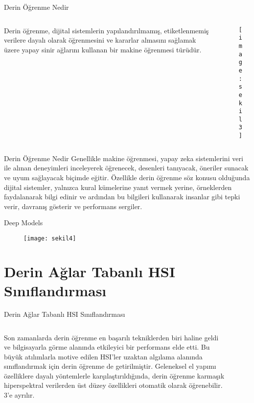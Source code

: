 \documentclass{beamer}
\begin{document}
\begin{frame}{Derin Öğrenme Nedir}
  \begin{columns}
    \begin{column}{0.5\textwidth}
Derin öğrenme, dijital sistemlerin yapılandırılmamış, etiketlenmemiş verilere dayalı olarak öğrenmesini ve kararlar almasını sağlamak üzere yapay sinir ağlarını kullanan bir makine öğrenmesi türüdür.
    \end{column}
    \begin{column}{0.5\textwidth}
      \begin{figure}
    \texttt{[image: sekil3]}
      \end{figure}
    \end{column}
  \end{columns}
\end{frame}

\begin{frame}{Derin Öğrenme Nedir}
  Genellikle makine öğrenmesi, yapay zeka sistemlerini veri ile alınan deneyimleri inceleyerek öğrenecek, desenleri tanıyacak, öneriler sunacak ve uyum sağlayacak biçimde eğitir. Özellikle derin öğrenme söz konusu olduğunda dijital sistemler, yalnızca kural kümelerine yanıt vermek yerine, örneklerden faydalanarak bilgi edinir ve ardından bu bilgileri kullanarak insanlar gibi tepki verir, davranış gösterir ve performans sergiler.
\end{frame}

\begin{frame}{Deep Models }
  \begin{figure}
    \centering
    \texttt{[image: sekil4]}
  \end{figure}
\end{frame}

\section{Derin Ağlar Tabanlı HSI Sınıflandırması}
\begin{frame}{Derin Ağlar Tabanlı HSI Sınıflandırması}
\begin{columns} 
  \begin{column}[]{0.5\textwidth}
Son zamanlarda derin öğrenme en başarılı tekniklerden biri haline geldi ve bilgisayarla görme alanında etkileyici bir performans elde etti. Bu büyük atılımlarla motive edilen HSI’ler uzaktan algılama alanında sınıflandırmak için derin öğrenme de getirilmiştir. Geleneksel el yapımı özelliklere dayalı yöntemlerle karşılaştırıldığında, derin öğrenme karmaşık hiperspektral verilerden üst düzey özellikleri otomatik olarak öğrenebilir. 3’e ayrılır.
  \end{column}
  \begin{column}[]{0.5\textwidth}
    \begin{figure}[]
      \texttt{[image: sekil5]}
    \end{figure}
  \end{column}
\end{columns}
\end{frame}
\end{document}
